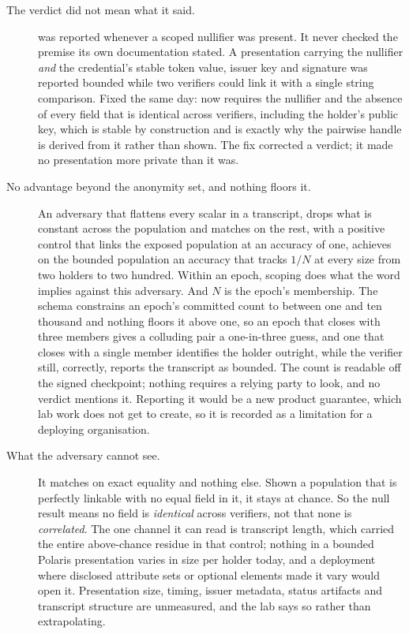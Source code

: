 \begin{description}
  \item[The verdict did not mean what it said.]  was reported whenever a scoped
    nullifier was present. It never checked the premise its own documentation stated. A presentation
    carrying the nullifier \emph{and} the credential's stable token value, issuer key and signature
    was reported bounded while two verifiers could link it with a single string comparison. Fixed the
    same day:  now requires the nullifier and the absence of every field that is
    identical across verifiers, including the holder's public key, which is stable by construction and
    is exactly why the pairwise handle is derived from it rather than shown. The fix corrected a
    verdict; it made no presentation more private than it was.
  \item[No advantage beyond the anonymity set, and nothing floors it.] An adversary that flattens
    every scalar in a transcript, drops what is constant across the population and matches on the
    rest, with a positive control that links the exposed population at an accuracy of one, achieves
    on the bounded population an accuracy that tracks $1/N$ at every size from two holders to two
    hundred. Within an epoch, scoping does what the word implies against this adversary. And
    $N$ is the epoch's membership. The schema constrains an epoch's committed count to between one
    and ten thousand and nothing floors it above one, so an epoch that closes with three members
    gives a colluding pair a one-in-three guess, and one that closes with a single member identifies
    the holder outright, while the verifier still, correctly, reports the transcript as bounded. The
    count is readable off the signed checkpoint; nothing requires a relying party to look, and no
    verdict mentions it. Reporting it would be a new product guarantee, which lab work does not get
    to create, so it is recorded as a limitation for a deploying organisation.
  \item[What the adversary cannot see.] It matches on exact equality and nothing else. Shown a
    population that is perfectly linkable with no equal field in it, it stays at chance. So the null
    result means no field is \emph{identical} across verifiers, not that none is \emph{correlated}.
    The one channel it can read is transcript length, which carried the entire above-chance residue
    in that control; nothing in a bounded Polaris presentation varies in size per holder today, and a
    deployment where disclosed attribute sets or optional elements made it vary would open it.
    Presentation size, timing, issuer metadata, status artifacts and transcript structure are
    unmeasured, and the lab says so rather than extrapolating.
\end{description}

